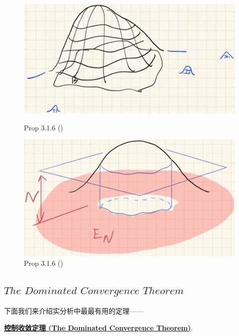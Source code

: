  	\begin{figure}[thbp!]
 		\centering
 		\begin{minipage}[t]{0.40\linewidth}
 			\centering
 			\includegraphics[width=0.65\linewidth]{figure/3.1.3-1}
 			\caption{Prop 3.1.6 ()}
 			\label{pic : 3.1.3-1} %
 		\end{minipage}
 		\begin{minipage}[t]{0.40\linewidth}
 			\centering
 			\includegraphics[width=0.65\linewidth]{figure/3.1.3-2}
 			\caption{Prop 3.1.6 ()} %
 			\label{pic : 3.1.3-2} %
 		\end{minipage}
 	\end{figure}

 \newpage
 
 \subsection{$The \,\, Dominated \,\, Convergence \,\, Theorem$}
 	下面我们来介绍实分析中最最有用的定理——
 	\begin{center}
 		\underline{\textbf{控制收敛定理 (The Dominated Convergence Theorem)}}.
 	\end{center}
 	
